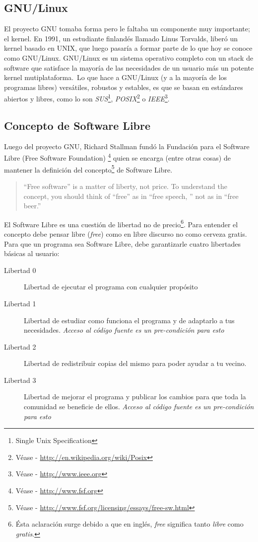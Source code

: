 \subsection{GNU/Linux}
El proyecto GNU tomaba forma pero le faltaba un componente muy importante; el
kernel. 
En 1991, un estudiante finland\'es llamado Linus Torvalds, liber\'o un kernel
basado en UNIX, que luego pasar\'ia a formar parte de lo que hoy se conoce como
GNU/Linux.
GNU/Linux es un sistema operativo completo con un stack de software que
satisface la mayor\'ia de las necesidades de un usuario m\'as un potente kernel
mutiplataforma.\
Lo que hace a GNU/Linux (y a la mayor\'ia de los programas libres)
vers\'atiles,
robustos y estables, es que se basan en est\'andares abiertos y libres, como lo
son \emph{SUS}\footnote{Single Unix Specification},
\emph{POSIX}\footnote{V\'ease - \url{http://en.wikipedia.org/wiki/Posix}} o
\emph{IEEE}\footnote{V\'ease - \url{http://www.ieee.org}}.

\subsection{Concepto de Software Libre}
Luego del proyecto GNU, Richard Stallman fund\'o la Fundaci\'on para el 
Software Libre (Free Software Foundation)
\footnote{V\'ease - \url{http://www.fsf.org}} quien se encarga (entre otras
cosas) de
mantener la definici\'on del concepto\footnote{V\'ease -
\url{http://www.fsf.org/licensing/essays/free-sw.html}} de Software Libre.

\begin{quote}
``Free software'' is a matter of liberty, not price. 
To understand the concept, you should think of ``free'' as in ``free speech,
'' not as in ``free beer.''
\end{quote}

El Software Libre es una cuesti\'on de libertad no de precio\footnote{\'Esta
aclaraci\'on surge debido a que en ingl\'es, \emph{free} significa tanto
\emph{libre} como \emph{gratis}.}. Para entender el concepto debe pensar libre
(\emph{free}) como en libre discurso no como cerveza gratis.\\

Para que un programa sea Software Libre, debe garantizarle cuatro libertades
b\'asicas al usuario:

\begin{description}
\item[Libertad 0] Libertad de ejecutar el programa con cualquier prop\'osito
\item[Libertad 1] Libertad de estudiar como funciona el programa y de
adaptarlo
a tus necesidades. \emph{Acceso al c\'odigo fuente es un pre-condici\'on para
esto}
\item[Libertad 2] Libertad de redistribuir copias del mismo para poder ayudar
a tu vecino.
\item[Libertad 3] Libertad de mejorar el programa y publicar los cambios para
que toda la comunidad se beneficie de ellos. \emph{Acceso al c\'odigo fuente
es un pre-condici\'on para esto}
\end{description}


